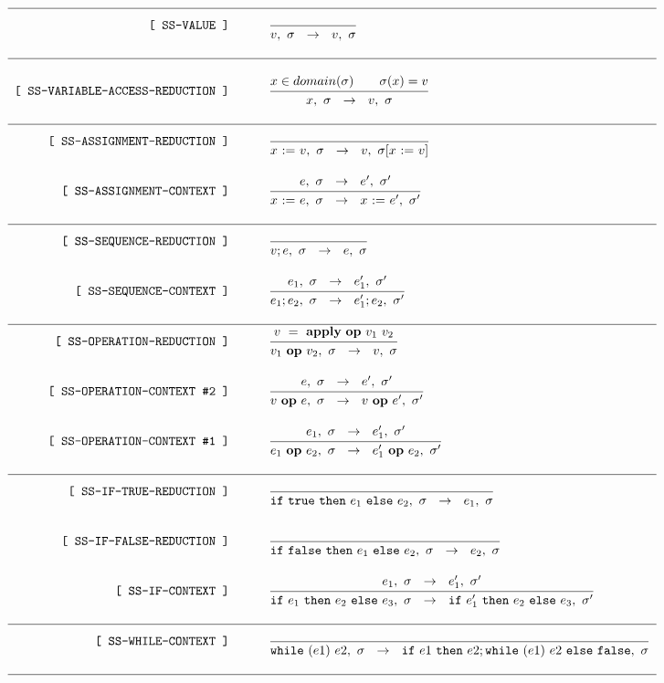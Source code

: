 \documentclass{article}
\begin{document}
\[
  \begin{array}{r@{\qquad}l}
    
    \hline

    \ssrule{
      SS-VALUE
    }{
      v,~\sigma
    }{
    }{
      v,~\sigma
    }

    \hline
    \\

    \ssrule{
      SS-VARIABLE-ACCESS-REDUCTION
    }{
      x,~\sigma
    }{
      x \in domain(\sigma) \qquad \sigma(x) = v
    }{
      v,~\sigma
    }

    \hline

    \ssrule{
      SS-ASSIGNMENT-REDUCTION
    }{
      \assign{x}{v},~\sigma
    }{
    }{
      v,~\sigma[\assign{x}{v}]
    }

    \ssrule{
      SS-ASSIGNMENT-CONTEXT
    }{
      \assign{x}{e},~\sigma
    }{
      e,~\sigma ~~ \rightarrow ~~ e',~\sigma'
    }{
      \assign{x}{e'},~\sigma'
    }

    \hline

    \ssrule{
      SS-SEQUENCE-REDUCTION
    }{
      v; e,~\sigma
    }{
    }{
      e,~\sigma
    }

    \ssrule{
      SS-SEQUENCE-CONTEXT
    }{
      e_1; e_2,~\sigma
    }{
      e_1,~\sigma~~\rightarrow~~e_1',~\sigma'
    }{
      e_1'; e_2,~\sigma'
    }

    \hline

    \ssrule{
      SS-OPERATION-REDUCTION
    }{
      v_1 ~\textbf{op} ~v_2,~\sigma
    }{
      v~=~\textbf{apply}~\textbf{op} ~v_1~v_2
    }{
      v,~\sigma
    }

    \ssrule{
      SS-OPERATION-CONTEXT \#2
    }{
      v ~\textbf{op} ~e,~\sigma
    }{
      e,~\sigma~~\rightarrow~~e',~\sigma'
    }{
      v ~\textbf{op} ~e',~\sigma'
    }

    \ssrule{
      SS-OPERATION-CONTEXT \#1
    }{
      e_1 ~\textbf{op} ~e_2,~\sigma
    }{
      e_1,~\sigma~~\rightarrow~~e_1',~\sigma'
    }{
      e_1' ~\textbf{op} ~e_2,~\sigma'
    }

    \hline

     \ssrule{
      SS-IF-TRUE-REDUCTION
    }{
      \ife{\true}{e_1}{e_2},~\sigma
    }{
    }{
      e_1,~\sigma
    }

    \ssrule{
      SS-IF-FALSE-REDUCTION
    }{
      \ife{\false}{e_1}{e_2},~\sigma
    }{
    }{
      e_2,~\sigma
    }

    \ssrule{
      SS-IF-CONTEXT
    }{
      \ife{e_1}{e_2}{e_3},~\sigma
    }{
      e_1,~\sigma~~\rightarrow~~e_1',~\sigma'
    }{
      \ife{e_1'}{e_2}{e_3},~\sigma'
    }

    \hline

    \ssrule{
      SS-WHILE-CONTEXT
    }{
      \whilee{e1}{e2},~\sigma
    }{
    }{
      \ife{e1}{e2;\whilee{e1}{e2}}{\false},~\sigma
    }

    \hline

\end{array}
\]
\end{document}
